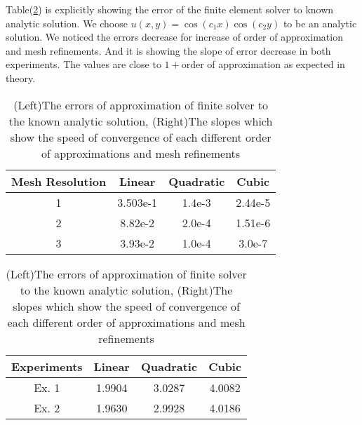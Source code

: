 Table(\ref{table_err1}) is explicitly showing the error of the
finite element solver to known analytic solution. We choose
$u(x,y) = \cos(c_1 x)\cos(c_2 y)$ to be an analytic solution. We
noticed the errors decrease for increase of order of approximation
and mesh refinements. And it is showing the slope of error
decrease in both experiments. The values are close to $1+$order of
approximation as expected in theory.
\begin{table}
\begin{center}
\caption{\label{table_err1} (Left)The errors of approximation of
finite solver to the known analytic solution, (Right)The slopes
which show the speed of convergence of each different order of
approximations and mesh refinements}
\begin{tabular}{|c||c|c|c|} \hline
    Mesh Resolution&Linear& Quadratic & Cubic \\ \hline \hline
    1&3.503e-1 & 1.4e-3 & 2.44e-5\\ \hline
    2&8.82e-2  & 2.0e-4 & 1.51e-6\\ \hline
    3&3.93e-2  & 1.0e-4 & 3.0e-7\\ \hline
\end{tabular}
\begin{tabular}{|c||c|c|c|} \hline
    Experiments&Linear& Quadratic & Cubic \\ \hline \hline
    Ex. 1&1.9904& 3.0287&   4.0082\\ \hline
    Ex. 2&1.9630& 2.9928&   4.0186\\ \hline
\end{tabular}
\end{center}
\end{table}
